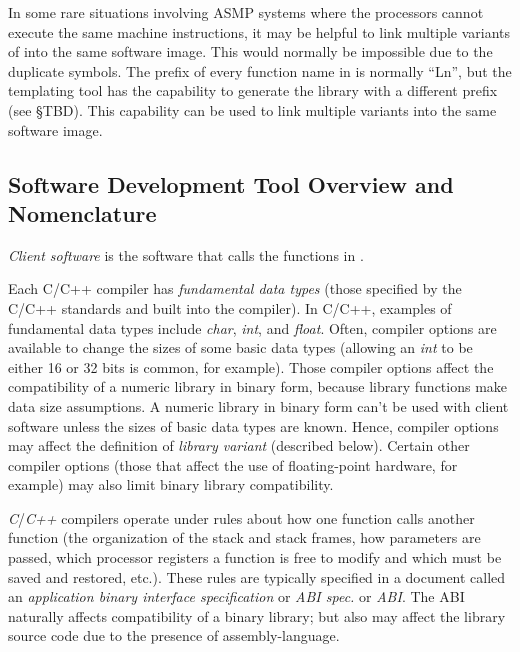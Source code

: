 In some rare situations involving ASMP systems where the processors
cannot execute the same machine instructions, it may be helpful to
link multiple variants of \emph{\productbasenameshort{}} into the
same software image.  This would normally be impossible due to the
duplicate symbols.  The prefix of every function name in
\emph{\productbasenameshort{}} is normally ``Ln'', but the templating tool
has the capability to generate the library with a different prefix (see
\S{}TBD).  This capability can be used to link multiple
\emph{\productbasenameshort{}} variants into the same software image.


\subsection{Software Development Tool Overview and Nomenclature}
\label{cldd0:snom0:ssdt0}

\emph{Client software} is the 
software that calls the functions in 
\emph{\productbasenameshort{}}.  

Each C/C++ compiler has \emph{fundamental data types} (those specified by the C/C++
standards and built into the compiler).
In C/C++, examples of fundamental data 
types include \emph{char}, \emph{int}, and \emph{float}.  
Often, compiler options are available to change the sizes of 
some basic data types (allowing an \emph{int} to be either 
16 or 32 bits is common, for example).  Those compiler 
options affect the compatibility of a numeric library in 
binary form, because library functions make data size 
assumptions.  A numeric library in binary form can't be used 
with client software unless the sizes of basic data types 
are known.  Hence, compiler options may affect the 
definition of \emph{library variant} (described below).  
Certain other compiler options (those that affect the use of 
floating-point hardware, for example) may also limit binary 
library compatibility.  

\emph{C}/\emph{C++} compilers operate under rules about how 
one function calls another function (the organization of the 
stack and stack frames, how parameters are passed, which 
processor registers a function is free to modify and which 
must be saved and restored, etc.).  These rules are 
typically specified in a document called an 
\emph{application binary 
interface specification} or \emph{ABI spec.} or 
\emph{ABI}\@.  The ABI naturally affects compatibility of a 
binary library; but also may affect the library source code 
due to the presence of assembly-language.  

